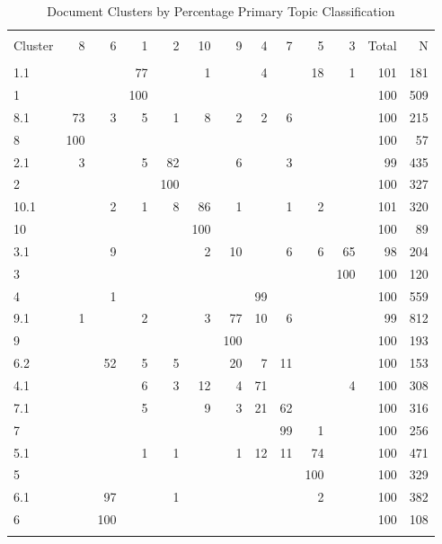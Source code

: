 \documentclass[]{book}
\theoremstyle{definition}
\theoremstyle{definition}
\theoremstyle{definition}
\theoremstyle{remark}
\begin{document}
\begin{table}[!htbp] \centering 
  \caption{Document Clusters by Percentage Primary Topic Classification} 
  \label{tab:hottable} 
\begin{tabular}{@{\extracolsep{5pt}} lrrrrrrrrrrrr} 
\\[-1.8ex]\hline 
\hline \\[-1.8ex] 
Cluster & 8 & 6 & 1 & 2 & 10 & 9 & 4 & 7 & 5 & 3 & Total & N \\ 
\hline \\[-1.8ex] 
1.1 &  &  & 77 &  & 1 &  & 4 &  & 18 & 1 & 101 & 181 \\ 
1 &  &  & 100 &  &  &  &  &  &  &  & 100 & 509 \\ 
8.1 & 73 & 3 & 5 & 1 & 8 & 2 & 2 & 6 &  &  & 100 & 215 \\ 
8 & 100 &  &  &  &  &  &  &  &  &  & 100 & 57 \\ 
2.1 & 3 &  & 5 & 82 &  & 6 &  & 3 &  &  & 99 & 435 \\ 
2 &  &  &  & 100 &  &  &  &  &  &  & 100 & 327 \\ 
10.1 &  & 2 & 1 & 8 & 86 & 1 &  & 1 & 2 &  & 101 & 320 \\ 
10 &  &  &  &  & 100 &  &  &  &  &  & 100 & 89 \\ 
3.1 &  & 9 &  &  & 2 & 10 &  & 6 & 6 & 65 & 98 & 204 \\ 
3 &  &  &  &  &  &  &  &  &  & 100 & 100 & 120 \\ 
4 &  & 1 &  &  &  &  & 99 &  &  &  & 100 & 559 \\ 
9.1 & 1 &  & 2 &  & 3 & 77 & 10 & 6 &  &  & 99 & 812 \\ 
9 &  &  &  &  &  & 100 &  &  &  &  & 100 & 193 \\ 
6.2 &  & 52 & 5 & 5 &  & 20 & 7 & 11 &  &  & 100 & 153 \\ 
4.1 &  &  & 6 & 3 & 12 & 4 & 71 &  &  & 4 & 100 & 308 \\ 
7.1 &  &  & 5 &  & 9 & 3 & 21 & 62 &  &  & 100 & 316 \\ 
7 &  &  &  &  &  &  &  & 99 & 1 &  & 100 & 256 \\ 
5.1 &  &  & 1 & 1 &  & 1 & 12 & 11 & 74 &  & 100 & 471 \\ 
5 &  &  &  &  &  &  &  &  & 100 &  & 100 & 329 \\ 
6.1 &  & 97 &  & 1 &  &  &  &  & 2 &  & 100 & 382 \\ 
6 &  & 100 &  &  &  &  &  &  &  &  & 100 & 108 \\ 
\hline \\[-1.8ex] 
\end{tabular} 
\end{table}
\end{document}
